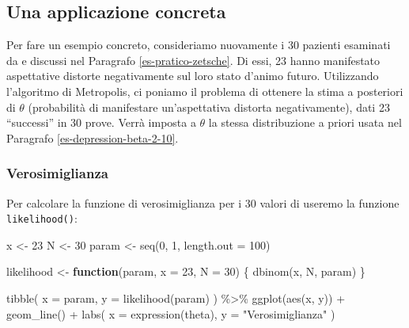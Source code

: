 \documentclass[
]{memoir}
\newenvironment{Shaded}{\begin{snugshade}}{\end{snugshade}}
\newcommand{\AttributeTok}[1]{\textcolor[rgb]{0.77,0.63,0.00}{#1}}
\newcommand{\ControlFlowTok}[1]{\textcolor[rgb]{0.13,0.29,0.53}{\textbf{#1}}}
\newcommand{\DecValTok}[1]{\textcolor[rgb]{0.00,0.00,0.81}{#1}}
\newcommand{\FunctionTok}[1]{\textcolor[rgb]{0.00,0.00,0.00}{#1}}
\newcommand{\NormalTok}[1]{#1}
\newcommand{\OtherTok}[1]{\textcolor[rgb]{0.56,0.35,0.01}{#1}}
\newcommand{\SpecialCharTok}[1]{\textcolor[rgb]{0.00,0.00,0.00}{#1}}
\newcommand{\StringTok}[1]{\textcolor[rgb]{0.31,0.60,0.02}{#1}}
\begin{document}
\hypertarget{una-applicazione-concreta}{%
\subsection{Una applicazione concreta}\label{una-applicazione-concreta}}

Per fare un esempio concreto, consideriamo nuovamente i 30 pazienti esaminati da \citet{zetschefuture2019} e discussi nel Paragrafo \ref{es-pratico-zetsche}. Di essi, 23 hanno manifestato aspettative distorte negativamente sul loro stato d'animo futuro. Utilizzando l'algoritmo di Metropolis, ci poniamo il problema di ottenere la stima a posteriori di \(\theta\) (probabilità di manifestare un'aspettativa distorta negativamente), dati 23 ``successi'' in 30 prove. Verrà imposta a \(\theta\) la stessa distribuzione a priori usata nel Paragrafo \ref{es-depression-beta-2-10}.

\hypertarget{verosimiglianza}{%
\subsubsection{Verosimiglianza}\label{verosimiglianza}}

Per calcolare la funzione di verosimiglianza per i 30 valori di \citet{zetschefuture2019} useremo la funzione \texttt{likelihood()}:

\begin{Shaded}
\begin{Highlighting}[]
\NormalTok{x }\OtherTok{\textless{}{-}} \DecValTok{23}
\NormalTok{N }\OtherTok{\textless{}{-}} \DecValTok{30}
\NormalTok{param }\OtherTok{\textless{}{-}} \FunctionTok{seq}\NormalTok{(}\DecValTok{0}\NormalTok{, }\DecValTok{1}\NormalTok{, }\AttributeTok{length.out =} \DecValTok{100}\NormalTok{)}

\NormalTok{likelihood }\OtherTok{\textless{}{-}} \ControlFlowTok{function}\NormalTok{(param, }\AttributeTok{x =} \DecValTok{23}\NormalTok{, }\AttributeTok{N =} \DecValTok{30}\NormalTok{) \{}
  \FunctionTok{dbinom}\NormalTok{(x, N, param)}
\NormalTok{\}}

\FunctionTok{tibble}\NormalTok{(}
  \AttributeTok{x =}\NormalTok{ param, }
  \AttributeTok{y =} \FunctionTok{likelihood}\NormalTok{(param)}
\NormalTok{) }\SpecialCharTok{\%\textgreater{}\%}
  \FunctionTok{ggplot}\NormalTok{(}\FunctionTok{aes}\NormalTok{(x, y)) }\SpecialCharTok{+}
  \FunctionTok{geom\_line}\NormalTok{() }\SpecialCharTok{+}
  \FunctionTok{labs}\NormalTok{(}
    \AttributeTok{x =} \FunctionTok{expression}\NormalTok{(theta),}
    \AttributeTok{y =} \StringTok{"Verosimiglianza"}
\NormalTok{  )}
\end{Highlighting}
\end{Shaded}
\end{document}
